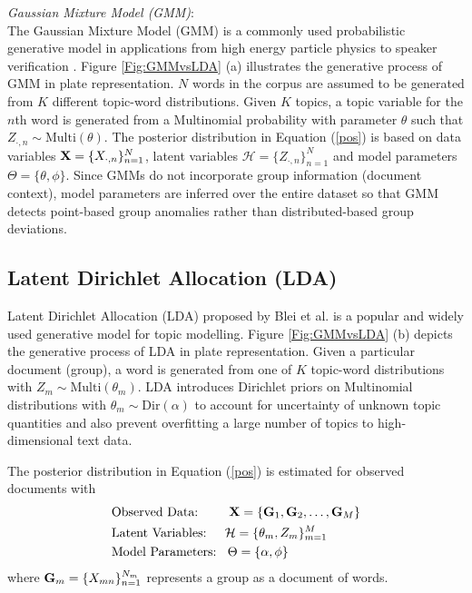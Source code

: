  { \it Gaussian Mixture Model (GMM)}: \\ 
The Gaussian Mixture Model (GMM) is a commonly used probabilistic generative model in applications from high energy particle physics \cite{GMM} to speaker verification \cite{speakerV}.   
Figure \ref{Fig:GMMvsLDA} (a) illustrates the generative process of GMM in plate representation. $N$ words in the corpus are assumed to be generated  from $K$ different topic-word distributions. 
Given $K$ topics, a topic variable for the $n$th word is generated from a Multinomial probability with parameter $\theta $ such that $Z_{\cdot,n} \sim \mbox{Multi}(\theta )$.    
The posterior distribution in Equation (\ref{pos}) is based on data variables ${\bf X}= \{ X_{{\cdot},n} \}_{n=1}^N $, latent variables $\mathcal{H}=\{Z_{\cdot,n}\}_{n=1}^N$ and model parameters $\Theta=\{\theta,\phi\}$.  Since GMMs do not incorporate  group information (document context),  model parameters are inferred  over the entire dataset so that GMM detects point-based group anomalies rather than distributed-based group deviations.  

\subsection{ Latent Dirichlet Allocation (LDA) }
 Latent Dirichlet Allocation (LDA) proposed by Blei et al. \cite{LDA} is a  popular and widely used generative model  for topic modelling. Figure \ref{Fig:GMMvsLDA} (b) depicts the generative process of LDA in plate representation. 
Given a particular document (group), a word is generated from one of $K$ topic-word distributions with $Z_{m} \sim \mbox{Multi}(\theta_m )$.  LDA  introduces 
  Dirichlet priors on Multinomial distributions with $\theta_m \sim \mbox{Dir}(\alpha)$  to account for  uncertainty of unknown topic quantities and also prevent  overfitting a large number of topics  to high-dimensional text data.

 The  posterior distribution in Equation (\ref{pos}) is estimated for observed documents   with 
 \begin{align*}
& \mbox{Observed Data:  \;\; \quad}  {\bf X}= \{{\bf G}_{1},{\bf G}_{2},\dots,{\bf G}_{M} \}\\
 & \mbox{Latent Variables: \quad}    \mathcal{H}=\{\theta_{m},Z_{m} \}_{m=1}^M  \\
 & \mbox{Model Parameters: \;\,}  \Theta=\{\alpha,\phi\} 
 \end{align*} 
   where ${\bf G}_{m} = \{ X_{mn} \}_{n=1}^{N_{m}}$ represents a group as a document of words.    
 
